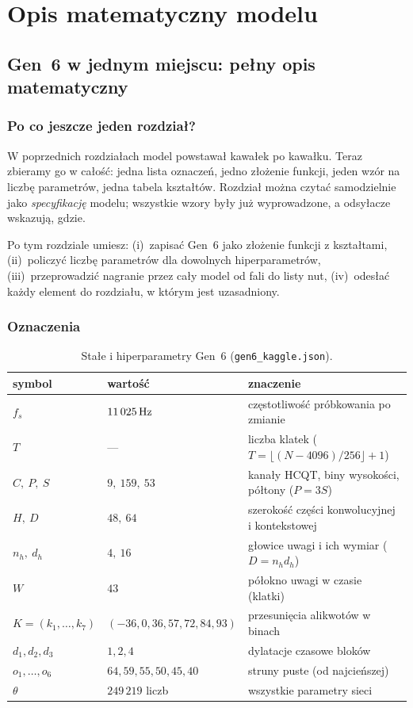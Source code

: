\part{Opis matematyczny modelu}

\chapter{Gen~6 w jednym miejscu: pełny opis matematyczny}\label{rozdz:opis}

\section{Po co jeszcze jeden rozdział?}

W poprzednich rozdziałach model powstawał kawałek po kawałku. Teraz zbieramy go w całość: jedna lista oznaczeń, jedno złożenie funkcji, jeden wzór na liczbę parametrów, jedna tabela kształtów. Rozdział można czytać samodzielnie jako
\emph{specyfikację} modelu; wszystkie wzory były już wyprowadzone, a odsyłacze wskazują, gdzie.

Po tym rozdziale umiesz: (i)~zapisać Gen~6 jako złożenie funkcji z kształtami, (ii)~policzyć liczbę parametrów dla dowolnych hiperparametrów, (iii)~przeprowadzić nagranie przez cały model od fali do listy nut, (iv)~odesłać każdy element do rozdziału, w którym jest uzasadniony.

\section{Oznaczenia}

\begin{table}[ht]
\centering\small
\begin{tabular}{@{}llp{6.1cm}@{}}
\toprule
symbol & wartość & znaczenie\\
\midrule
$f_s$ & $11\,025\,\mathrm{Hz}$ & częstotliwość próbkowania po zmianie\\
$T$ & --- & liczba klatek ($T=\lfloor(N-4096)/256\rfloor+1$)\\
$C,\ P,\ S$ & $9,\ 159,\ 53$ & kanały HCQT, biny wysokości, półtony ($P=3S$)\\
$H,\ D$ & $48,\ 64$ & szerokość części konwolucyjnej i kontekstowej\\
$n_h,\ d_h$ & $4,\ 16$ & głowice uwagi i ich wymiar ($D=n_hd_h$)\\
$W$ & $43$ & półokno uwagi w czasie (klatki)\\
$K=(k_1,\dots,k_7)$ & $(-36,0,36,57,72,84,93)$ & przesunięcia alikwotów w binach\\
$d_1,d_2,d_3$ & $1,2,4$ & dylatacje czasowe bloków\\
$o_1,\dots,o_6$ & $64,59,55,50,45,40$ & struny puste (od najcieńszej)\\
$\theta$ & $249\,219$ liczb & wszystkie parametry sieci\\
\bottomrule
\end{tabular}
\caption{Stałe i hiperparametry Gen~6 (\texttt{gen6\_kaggle.json}).}
\label{tab:oznaczenia}
\end{table}

